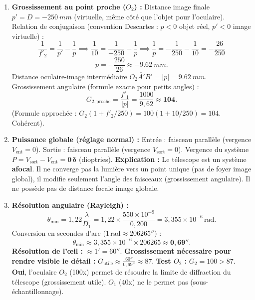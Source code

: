 \documentclass[11pt]{article}
\begin{document}
\begin{exoresolu}
\begin{enumerate}
    \textbf{Conclusion :} $O_1$ (\SI{25}{mm}) est plus confortable pour l'observation nocturne (nébuleuses, galaxies). $O_2$ réserve aux planètes/Lune (fort grossissement, objet lumineux).
    \item \textbf{Grossissement au point proche ($O_2$) :}
    Distance image finale $p' = D = -\SI{250}{mm}$ (virtuelle, même côté que l'objet pour l'oculaire).
    Relation de conjugaison (convention Descartes : $p<0$ objet réel, $p'<0$ image virtuelle) :
    \[
    \frac{1}{f'_2} = \frac{1}{p'} - \frac{1}{p} \implies \frac{1}{10} = \frac{1}{-250} - \frac{1}{p} \implies \frac{1}{p} = -\frac{1}{250} - \frac{1}{10} = -\frac{26}{250}
    \]
    \[
    p = -\frac{250}{26} \approx -\SI{9,62}{mm}.
    \]
    Distance oculaire-image intermédiaire $\overline{O_2A'B'} = |p| = \SI{9,62}{mm}$.
    Grossissement angulaire (formule exacte pour petits angles) :
    \[
    G_{2,\text{proche}} = \frac{f'_1}{|p|} = \frac{1000}{9,62} \approx \mathbf{104}.
    \]
    (Formule approchée : $G_2(1 + f'_2/250) = 100(1 + 10/250) = 104$. Cohérent).
    \item \textbf{Puissance globale (réglage normal) :}
    Entrée : faisceau parallèle (vergence $V_{\text{ent}} = 0$). Sortie : faisceau parallèle (vergence $V_{\text{sort}} = 0$).
    Vergence du système $P = V_{\text{sort}} - V_{\text{ent}} = \mathbf{0\,\delta}$ (dioptries).
    \textbf{Explication :} Le télescope est un système \textbf{afocal}. Il ne converge pas la lumière vers un point unique (pas de foyer image global), il modifie seulement l'angle des faisceaux (grossissement angulaire). Il ne possède pas de distance focale image globale.
    \item \textbf{Résolution angulaire (Rayleigh) :}
    \[
    \theta_{\min} = 1{,}22 \frac{\lambda}{D_1} = 1{,}22 \times \frac{550 \times 10^{-9}}{0,200} = 3,355 \times 10^{-6}\,\text{rad}.
    \]
    Conversion en secondes d'arc ($1\,\text{rad} \approx 206265''$) :
    \[
    \theta_{\min} \approx 3,355 \times 10^{-6} \times 206265 \approx \mathbf{0,69''}.
    \]
    \textbf{Résolution de l'œil :} $\approx 1' = 60''$.
    \textbf{Grossissement nécessaire pour rendre visible le détail :} $G_{\text{utile}} \approx \frac{60''}{0,69''} \approx 87$.
    \textbf{Test $O_2$ :} $G_2 = 100 > 87$. \textbf{Oui}, l'oculaire $O_2$ (100x) permet de résoudre la limite de diffraction du télescope (grossissement utile). $O_1$ (40x) ne le permet pas (sous-échantillonnage).
\end{enumerate}
\end{exoresolu}
\end{document}
